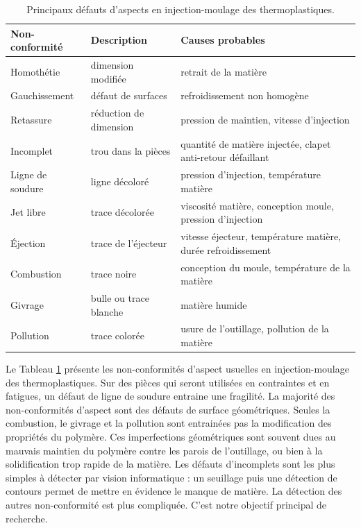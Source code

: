 \begin{table}[htbp]
	\hspace*{-3mm}
	\begin{tabular}{|l|l|l|}
		\arrayrulecolor{black}
		\hline
		Non-conformité & Description & Causes probables \\ \hline \hline
		Homothétie & dimension modifiée & retrait de la matière \\ \hline
		Gauchissement & défaut de surfaces & refroidissement non homogène \\ \hline
		Retassure  & réduction de dimension & pression de maintien, vitesse d'injection \\ \hline
		Incomplet & trou dans la pièces & quantité de matière injectée, clapet anti-retour défaillant \\ \hline
		Ligne de soudure & ligne décoloré &  pression d'injection, température matière \\ \hline
		Jet libre & trace décolorée & viscosité matière, conception moule, pression d'injection \\ \hline
		Éjection & trace de l'éjecteur & vitesse éjecteur, température matière, durée refroidissement \\ \hline \hline
		Combustion & trace noire & conception du moule, température de la matière \\ \hline
		Givrage & bulle ou trace blanche & matière humide \\ \hline
		Pollution & trace colorée & usure de l'outillage, pollution de la matière \\ \hline
	\end{tabular}
	\caption{Principaux défauts d'aspects en injection-moulage des thermoplastiques.}
	\label{tab:visual_defect}
\end{table}

Le Tableau \ref{tab:visual_defect} présente les non-conformités d'aspect usuelles en injection-moulage des thermoplastiques.
Sur des pièces qui seront utilisées en contraintes et en fatigues, un défaut de ligne de soudure entraine une fragilité.
La majorité des non-conformités d'aspect sont des défauts de surface géométriques.
Seules la combustion, le givrage et la pollution sont entrainées pas la modification des propriétés du polymère.
Ces imperfections géométriques sont souvent dues au mauvais maintien du polymère contre les parois de l'outillage, ou bien à la solidification trop rapide de la matière.
Les défauts d'incomplets sont les plus simples à détecter par vision informatique : un seuillage puis une détection de contours permet de mettre en évidence le manque de matière.
La détection des autres non-conformité est plus compliquée.
C'est notre objectif principal de recherche.

